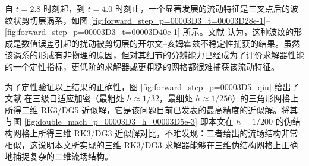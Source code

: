 自 $t=2.8$ 时刻起，到 $t=4.0$ 时刻止，一个显著发展的流动特征是三叉点后的波纹状剪切层涡系，如图 \ref{fig:forward_step_p=00003D3_t=00003D28e-1}–\ref{fig:forward_step_p=00003D3_t=00003D40e-1}
所示。文献 \cite{Woodward_1984} 认为，这种波纹的形成是数值误差引起的扰动被剪切层的开尔文–亥姆霍兹不稳定性捕获的结果。虽然该涡系的形成有非物理的原因，但对其细节的分辨能力已经成为了评价求解器性能的一个定性指标，更低阶的求解器或更粗糙的网格都很难捕获该流动特征。

为了定性验证以上结果的正确性，图 \ref{fig:forward_step_p=00003D5_qiu} 给出了文献 \cite{Giri_2019}
在三级自适应加密（最粗处 $h\approx1/32$，最细处 $h\approx1/256$）的三角形网格上所得二维 RK3/DG5
近似解，它是该问题目前已发表的最高精度的近似解。将其与图 \ref{fig:double_mach_p=00003D3_h=00003D5e-3}
即本文在 $h=1/200$ 的伪结构网格上所得三维 RK3/DG3 近似解对比，不难发现：二者给出的流场结构非常相似，这说明本文所实现的三维
RK3/DG3 求解器能够在三维伪结构网格上正确地捕捉复杂的二维流场结构。

\newpage{}


